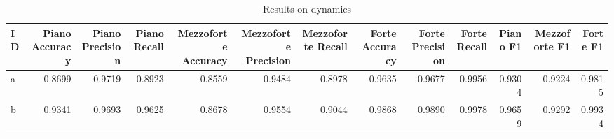 \begin{table}
\centering
\caption{Results on dynamics}
\label{tb:dynsol}
\begin{tabular}{lrrrrrrrrrrrr}
\toprule
ID &  Piano Accuracy &  Piano Precision &  Piano Recall &  Mezzoforte Accuracy &  Mezzoforte Precision &  Mezzoforte Recall &  Forte Accuracy &  Forte Precision &  Forte Recall &  Piano F1 &  Mezzoforte F1 &  Forte F1 \\
\midrule
 a &          0.8699 &           0.9719 &        0.8923 &               0.8559 &                0.9484 &             0.8978 &          0.9635 &           0.9677 &        0.9956 &    0.9304 &         0.9224 &    0.9815 \\
 b &          0.9341 &           0.9693 &        0.9625 &               0.8678 &                0.9554 &             0.9044 &          0.9868 &           0.9890 &        0.9978 &    0.9659 &         0.9292 &    0.9934 \\
\bottomrule
\end{tabular}
\end{table}
